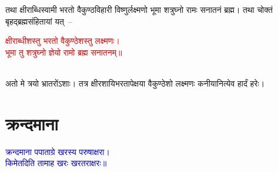 \begin{sloppypar}\justifying\noindent तथा क्षीराब्धि\-स्वामी भरतो वैकुण्ठ\-विहारी विष्णुर्लक्ष्मणो भूमा शत्रुघ्नो रामः सनातनं ब्रह्म। तथा चोक्तं बृहद्ब्रह्मसंहितायां यत्~–\end{sloppypar}
\centering\textcolor{red}{क्षीराब्धीशस्तु भरतो वैकुण्ठेशस्तु लक्ष्मणः।\nopagebreak\\
भूमा तु शत्रुघ्नो ज्ञेयो रामो ब्रह्म सनातनम्॥}\nopagebreak\\
\\
\begin{sloppypar}\justifying\noindent अतो मे त्रयो भ्रातरोंऽशाः। तत्र क्षीर\-शायि\-भरतापेक्षया वैकुण्ठेशो लक्ष्मणः कनीयानित्येव हार्दं हरेः।\end{sloppypar}
\section[क्रन्दमाना]{क्रन्दमाना}
\centering\textcolor{blue}{क्रन्दमाना पपाताग्रे खरस्य परुषाक्षरा।\nopagebreak\\
किमेतदिति तामाह खरः खरतराक्षरः॥}\nopagebreak\\
\\
